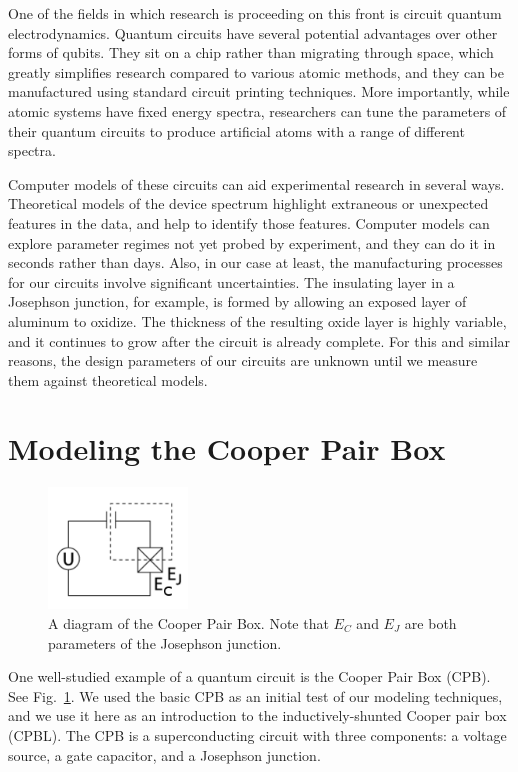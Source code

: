 \documentclass[twocolumn]{revtex4}
\newcommand{\figwidth}{0.33\textwidth}
\begin{document}
One of the fields in which research is proceeding on this front is
circuit quantum electrodynamics. Quantum circuits have several
potential advantages over other forms of qubits. They sit on a chip
rather than migrating through space, which greatly simplifies research
compared to various atomic methods, and they can be manufactured using
standard circuit printing techniques. More importantly, while atomic
systems have fixed energy spectra, researchers can tune the parameters
of their quantum circuits to produce artificial atoms with a range of
different spectra.

Computer models of these circuits can aid experimental research in
several ways. Theoretical models of the device spectrum highlight
extraneous or unexpected features in the data, and help to identify
those features. Computer models can explore parameter regimes not yet
probed by experiment, and they can do it in seconds rather than
days. Also, in our case at least, the manufacturing processes for our
circuits involve significant uncertainties. The insulating layer in a
Josephson junction, for example, is formed by allowing an exposed
layer of aluminum to oxidize. The thickness of the resulting oxide
layer is highly variable, and it continues to grow after the circuit
is already complete. For this and similar reasons, the design
parameters of our circuits are unknown until we measure them against
theoretical models.

\section{Modeling the Cooper Pair Box}

\begin{figure}
  \includegraphics[width=\figwidth]{CPB-circuit.png}
  \caption{A diagram of the Cooper Pair Box. Note that $E_C$ and $E_J$
    are both parameters of the Josephson junction.}
  \label{cpb-circuit}
\end{figure}

One well-studied example of a quantum circuit is the Cooper Pair Box
(CPB). See Fig.~\ref{cpb-circuit}. We used the basic CPB as an initial
test of our modeling techniques, and we use it here as an introduction
to the inductively-shunted Cooper pair box (CPBL). The CPB is a
superconducting circuit with three components: a voltage source, a
gate capacitor, and a Josephson junction.
\end{document}
